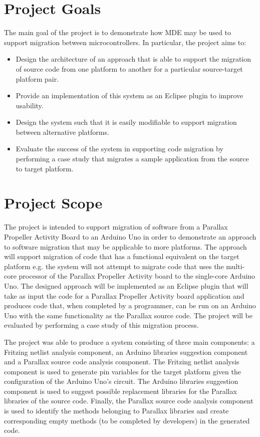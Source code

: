 \documentclass{UoYCSproject}
\begin{document}
\section{Project Goals}
The main goal of the project is to demonstrate how MDE may be used to support migration between microcontrollers. In particular, the project aims to:
\begin{itemize}
\item Design the architecture of an approach that is able to support the migration of source code from one platform to another for a particular source-target platform pair.
\item Provide an implementation of this system as an Eclipse plugin to improve usability.
\item Design the system such that it is easily modifiable to support migration between alternative platforms.
\item Evaluate the success of the system in supporting code migration by performing a case study that migrates a sample application from the source to target platform.
\end{itemize}

\section{Project Scope}
The project is intended to support migration of software from a Parallax Propeller Activity Board to an Arduino Uno in order to demonstrate an approach to software migration that may be applicable to more platforms. The approach will support migration of code that has a functional equivalent on the target platform e.g. the system will not attempt to migrate code that uses the multi-core processor of the Parallax Propeller Activity board to the single-core Arduino Uno. The designed approach will be implemented as an Eclipse plugin that will take as input the code for a Parallax Propeller Activity board application and produces code that, when completed by a programmer, can be run on an Arduino Uno with the same functionality as the Parallax source code. The project will be evaluated by performing a case study of this migration process.

The project was able to produce a system consisting of three main components: a Fritzing netlist analysis component, an Arduino libraries suggestion component and a Parallax source code analysis component. The Fritzing netlist analysis component is used to generate pin variables for the target platform given the configuration of the Arduino Uno's circuit. The Arduino libraries suggestion component is used to suggest possible replacement libraries for the Parallax libraries of the source code. Finally, the Parallax source code analysis component is used to identify the methods belonging to Parallax libraries and create corresponding empty methods (to be completed by developers) in the generated code.  
\end{document}
